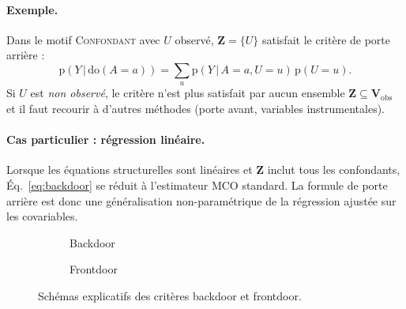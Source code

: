 \documentclass[11pt,a4paper]{article}
\newcommand{\rmdo}{\mathrm{do}}
\newcommand{\g}{\,\vert\,}
\newcommand{\pr}{\mathrm{p}}
\begin{document}
\paragraph{Exemple.}
Dans le motif \textsc{Confondant} avec $U$ observé, $\mathbf{Z} = \{U\}$ satisfait le critère de porte arrière :
\begin{equation}
  \pr(Y \g \rmdo(A=a)) = \sum_{u} \pr(Y \g A=a, U=u)\, \pr(U=u).
\end{equation}
Si $U$ est \emph{non observé}, le critère n'est plus satisfait par aucun ensemble $\mathbf{Z} \subseteq \mathbf{V}_\text{obs}$ et il faut recourir à d'autres méthodes (porte avant, variables instrumentales).

\paragraph{Cas particulier : régression linéaire.}
Lorsque les équations structurelles sont linéaires et $\mathbf{Z}$ inclut tous les confondants, Éq.~\eqref{eq:backdoor} se réduit à l'estimateur MCO standard.
La formule de porte arrière est donc une généralisation non-paramétrique de la régression ajustée sur les covariables.

\begin{figure}[h!]
\centering
\begin{subfigure}[t]{0.48\textwidth}
\centering
{}
\caption{Backdoor}
\end{subfigure}
\hfill
\begin{subfigure}[t]{0.48\textwidth}
\centering
{}
\caption{Frontdoor}
\end{subfigure}
\caption{Schémas explicatifs des critères backdoor et frontdoor.}
\label{fig:backdoor_frontdoor_tikz}
\end{figure}
\end{document}
